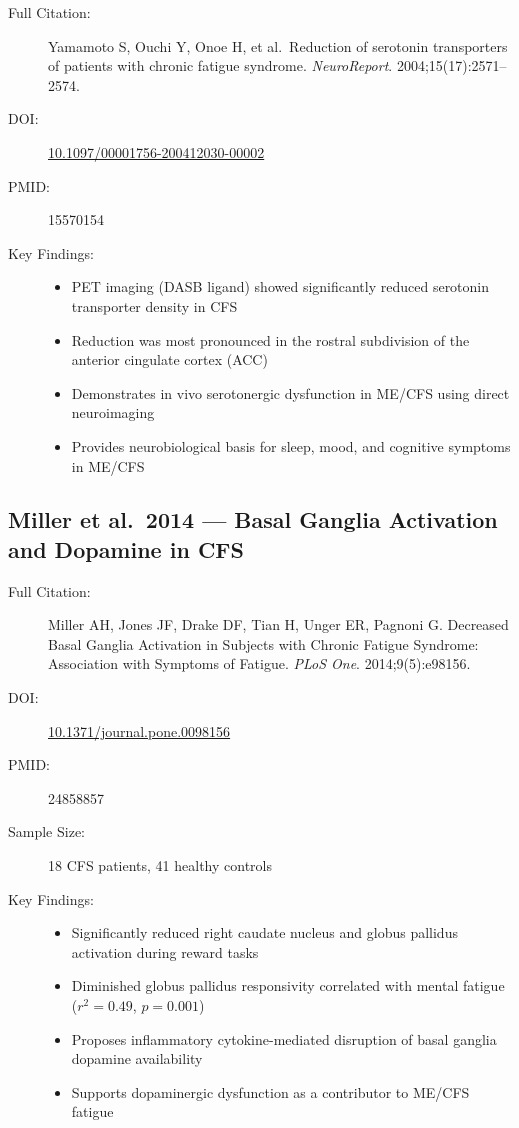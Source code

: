 \begin{description}
    \item[Full Citation:] Yamamoto S, Ouchi Y, Onoe H, et al.\ Reduction of serotonin transporters of patients with chronic fatigue syndrome. \textit{NeuroReport}. 2004;15(17):2571--2574.
    \item[DOI:] \href{https://doi.org/10.1097/00001756-200412030-00002}{10.1097/00001756-200412030-00002}
    \item[PMID:] 15570154
    \item[Key Findings:]
    \begin{itemize}
        \item PET imaging (DASB ligand) showed significantly reduced serotonin transporter density in CFS
        \item Reduction was most pronounced in the rostral subdivision of the anterior cingulate cortex (ACC)
        \item Demonstrates in vivo serotonergic dysfunction in ME/CFS using direct neuroimaging
        \item Provides neurobiological basis for sleep, mood, and cognitive symptoms in ME/CFS
    \end{itemize}
\end{description}

\subsection{Miller et al.\ 2014 --- Basal Ganglia Activation and Dopamine in CFS}

\begin{description}
    \item[Full Citation:] Miller AH, Jones JF, Drake DF, Tian H, Unger ER, Pagnoni G\@. Decreased Basal Ganglia Activation in Subjects with Chronic Fatigue Syndrome: Association with Symptoms of Fatigue. \textit{PLoS One}. 2014;9(5):e98156.
    \item[DOI:] \href{https://doi.org/10.1371/journal.pone.0098156}{10.1371/journal.pone.0098156}
    \item[PMID:] 24858857
    \item[Sample Size:] 18 CFS patients, 41 healthy controls
    \item[Key Findings:]
    \begin{itemize}
        \item Significantly reduced right caudate nucleus and globus pallidus activation during reward tasks
        \item Diminished globus pallidus responsivity correlated with mental fatigue ($r^2 = 0.49$, $p = 0.001$)
        \item Proposes inflammatory cytokine-mediated disruption of basal ganglia dopamine availability
        \item Supports dopaminergic dysfunction as a contributor to ME/CFS fatigue
    \end{itemize}
\end{description}

